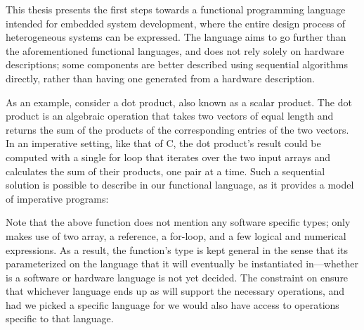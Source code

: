 \documentclass[../main.tex]{subfiles}
\begin{document}


This thesis presents the first steps towards a functional programming language intended for embedded system development, where the entire design process of heterogeneous systems can be expressed. The language aims to go further than the aforementioned functional languages, and does not rely solely on hardware descriptions; some components are better described using sequential algorithms directly, rather than having one generated from a hardware description.

As an example, consider a dot product, also known as a scalar product. The dot product is an algebraic operation that takes two vectors of equal length and returns the sum of the products of the corresponding entries of the two vectors. In an imperative setting, like that of C, the dot product's result could be computed with a single for loop that iterates over the two input arrays and calculates the sum of their products, one pair at a time. Such a sequential solution is possible to describe in our functional language, as it provides a model of imperative programs:


Note that the above  function does not mention any software specific types;  only makes use of two array, a reference, a for-loop, and a few logical and numerical expressions. As a result, the function's type is kept general in the sense that its parameterized on the language  that it will eventually be instantiated in---whether  is a software or hardware language is not yet decided. The constraint  on  ensure that whichever language  ends up as will support the necessary operations, and had we picked a specific language for  we would also have access to operations specific to that language.
\end{document}
